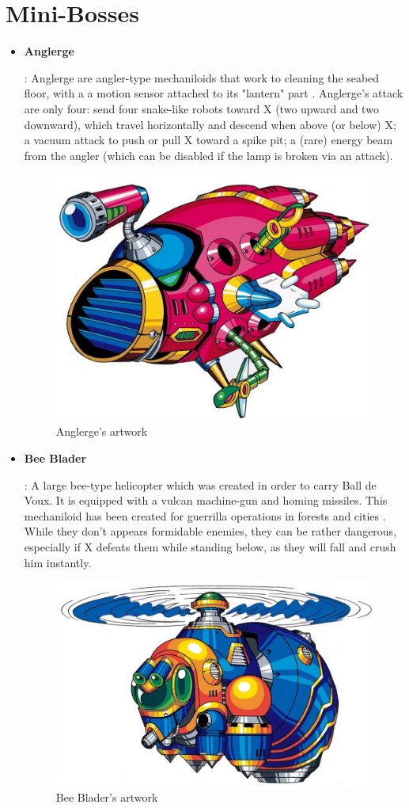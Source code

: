 \section{Mini-Bosses}
	\begin{itemize}
<<<<<<< HEAD
		\item \hypertarget{miniboss:Anglerge}{\textbf{Anglerge}}:
		Anglerge are angler-type mechaniloids that work to cleaning the seabed floor, with a  a motion sensor attached to its "lantern" part \cite{wayback:X_resources}. Anglerge's attack are only four: send four snake-like robots toward X (two upward and two downward), which travel horizontally and descend when above (or below) X; a vacuum attack to push or pull X toward a spike pit; a (rare) energy beam from the angler (which can be disabled if the lamp is broken via an attack).
		\begin{figure}[htp]
			\centering
			\includegraphics[width=0.5\linewidth]{figures/X1/enemies/Anglerge.jpg}
			\caption{Anglerge's artwork}
		\end{figure}
	
		\item \hypertarget{miniboss:Bee_Blader}{\textbf{Bee Blader}}:
		A large bee-type helicopter which was created in order to carry Ball de Voux. It is equipped with a vulcan machine-gun and homing missiles. This mechaniloid has been created for guerrilla operations in forests and cities \cite{wayback:X_resources}. While they don't appears formidable enemies, they can be rather dangerous, especially if X defeats them while standing below, as they will fall and crush him instantly.
		\begin{figure}[htp]
			\centering
			\includegraphics[width=0.6\linewidth]{figures/X1/enemies/BeeBlader.jpg}
			\caption{Bee Blader's artwork}
		\end{figure}
	

\end{itemize}
